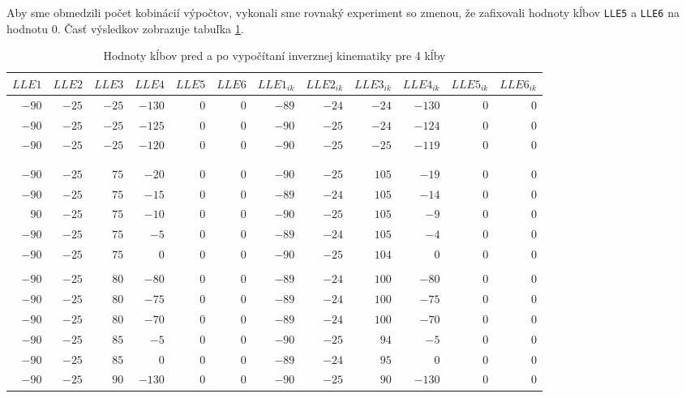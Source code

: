 Aby sme obmedzili počet kobinácií výpočtov, vykonali sme rovnaký experiment so zmenou, že zafixovali hodnoty kĺbov \texttt{LLE5} a \texttt{LLE6} na hodnotu $0$. Časť výsledkov zobrazuje tabuľka \ref{tab_test_ik_4joint_5deg}.

\begin{table}[H]
	\centering
	\tiny
	\begin{tabular}{||r|r|r|r|r|r||r|r|r|r|r|r||}
		\hline
		\hline
		$LLE1$ & $LLE2$ & $LLE3$ & $LLE4$ & $LLE5$ & $LLE6$ & $LLE1_{ik}$ & $LLE2_{ik}$ & $LLE3_{ik}$ & $LLE4_{ik}$ & $LLE5_{ik}$ & $LLE6_{ik}$ \\
		\hline
		\hline
		$-90$ & $-25$ & $-25$ & $-130$ & $0$ & $0$ & $-89$ & $-24$ & $-24$ & $-130$ & $0$ & $0$ \\
		\hline
		$-90$ & $-25$ & $-25$ & $-125$ & $0$ & $0$ & $-90$ & $-25$ & $-24$ & $-124$ & $0$ & $0$ \\
		\hline
		$-90$ & $-25$ & $-25$ & $-120$ & $0$ & $0$ & $-90$ & $-25$ & $-25$ & $-119$ & $0$ & $0$ \\
		\hline
		 & & & & & & & & & & & \\
		 \hline
		 & & & & & & & & & & & \\
		 \hline
		 $-90$ & $-25$ & $75$ & $-20$ & $0$ & $0$ & $-90$ & $-25$ & $105$ & $-19$ & $0$ & $0$ \\
		 \hline
		$-90$ & $-25$ & $75$ & $-15$ & $0$ & $0$ & $-89$ & $-24$ & $105$ & $-14$ & $0$ & $0$ \\
		\hline
		$90$ & $-25$ & $75$ & $-10$ & $0$ & $0$ & $-90$ & $-25$ & $105$ & $-9$ & $0$ & $0$ \\
		\hline
		$-90$ & $-25$ & $75$ & $-5$ & $0$ & $0$ & $-89$ & $-24$ & $105$ & $-4$ & $0$ & $0$ \\
		\hline
		$-90$ & $-25$ & $75$ & $0$ & $0$ & $0$ & $-90$ & $-25$ & $104$ & $0$ & $0$ & $0$ \\
		\hline
		 & & & & & & & & & & & \\
		\hline
		$-90$ & $-25$ & $80$ & $-80$ & $0$ & $0$ & $-89$ & $-24$ & $100$ & $-80$ & $0$ & $0$ \\
		\hline
		$-90$ & $-25$ & $80$ & $-75$ & $0$ & $0$ & $-89$ & $-24$ & $100$ & $-75$ & $0$ & $0$ \\
		\hline
		$-90$ & $-25$ & $80$ & $-70$ & $0$ & $0$ & $-89$ & $-24$ & $100$ & $-70$ & $0$ & $0$ \\
		\hline
		$-90$ & $-25$ & $85$ & $-5$ & $0$ & $0$ & $-90$ & $-25$ & $94$ & $-5$ & $0$ & $0$ \\
		\hline
		$-90$ & $-25$ & $85$ & $0$ & $0$ & $0$ & $-89$ & $-24$ & $95$ & $0$ & $0$ & $0$ \\
		\hline
		$-90$ & $-25$ & $90$ & $-130$ & $0$ & $0$ & $-90$ & $-25$ & $90$ & $-130$ & $0$ & $0$ \\
		\hline
		\hline
	\end{tabular}
	\caption{Hodnoty kĺbov pred a po vypočítaní inverznej kinematiky pre 4 kĺby}
	\label{tab_test_ik_4joint_5deg}
\end{table}

